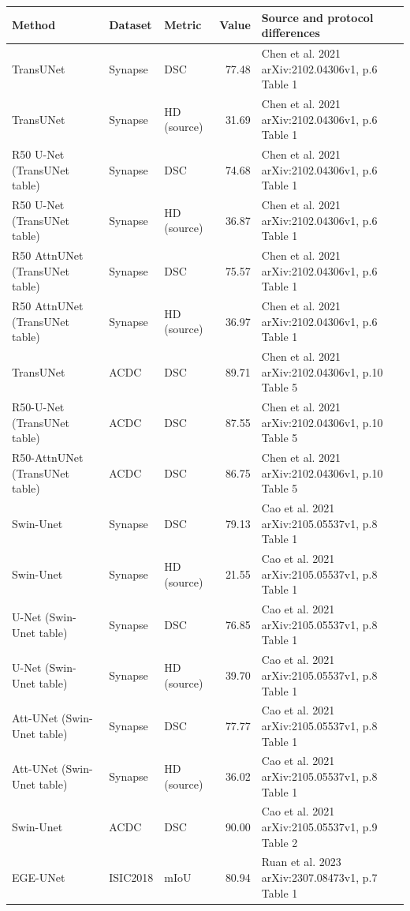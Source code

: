 \begin{tabular}{p{3.2cm}p{2.4cm}p{2.2cm}rp{5.2cm}}
\toprule
Method & Dataset & Metric & Value & Source and protocol differences \\
\midrule
TransUNet & Synapse & DSC & 77.48 & Chen et al. 2021 arXiv:2102.04306v1, p.6 Table 1 \\
TransUNet & Synapse & HD (source) & 31.69 & Chen et al. 2021 arXiv:2102.04306v1, p.6 Table 1 \\
R50 U-Net (TransUNet table) & Synapse & DSC & 74.68 & Chen et al. 2021 arXiv:2102.04306v1, p.6 Table 1 \\
R50 U-Net (TransUNet table) & Synapse & HD (source) & 36.87 & Chen et al. 2021 arXiv:2102.04306v1, p.6 Table 1 \\
R50 AttnUNet (TransUNet table) & Synapse & DSC & 75.57 & Chen et al. 2021 arXiv:2102.04306v1, p.6 Table 1 \\
R50 AttnUNet (TransUNet table) & Synapse & HD (source) & 36.97 & Chen et al. 2021 arXiv:2102.04306v1, p.6 Table 1 \\
TransUNet & ACDC & DSC & 89.71 & Chen et al. 2021 arXiv:2102.04306v1, p.10 Table 5 \\
R50-U-Net (TransUNet table) & ACDC & DSC & 87.55 & Chen et al. 2021 arXiv:2102.04306v1, p.10 Table 5 \\
R50-AttnUNet (TransUNet table) & ACDC & DSC & 86.75 & Chen et al. 2021 arXiv:2102.04306v1, p.10 Table 5 \\
Swin-Unet & Synapse & DSC & 79.13 & Cao et al. 2021 arXiv:2105.05537v1, p.8 Table 1 \\
Swin-Unet & Synapse & HD (source) & 21.55 & Cao et al. 2021 arXiv:2105.05537v1, p.8 Table 1 \\
U-Net (Swin-Unet table) & Synapse & DSC & 76.85 & Cao et al. 2021 arXiv:2105.05537v1, p.8 Table 1 \\
U-Net (Swin-Unet table) & Synapse & HD (source) & 39.70 & Cao et al. 2021 arXiv:2105.05537v1, p.8 Table 1 \\
Att-UNet (Swin-Unet table) & Synapse & DSC & 77.77 & Cao et al. 2021 arXiv:2105.05537v1, p.8 Table 1 \\
Att-UNet (Swin-Unet table) & Synapse & HD (source) & 36.02 & Cao et al. 2021 arXiv:2105.05537v1, p.8 Table 1 \\
Swin-Unet & ACDC & DSC & 90.00 & Cao et al. 2021 arXiv:2105.05537v1, p.9 Table 2 \\
EGE-UNet & ISIC2018 & mIoU & 80.94 & Ruan et al. 2023 arXiv:2307.08473v1, p.7 Table 1 \\

\end{tabular}
